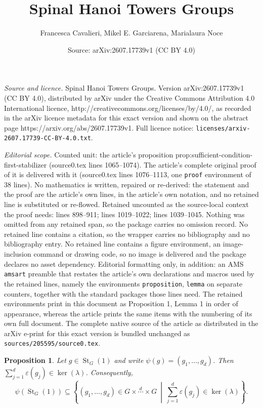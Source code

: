 \documentclass[10pt,a4paper]{amsart}
\title{Spinal Hanoi Towers Groups}
\author{Francesca Cavalieri, Mikel E. Garciarena, Marialaura Noce}
\date{Source: arXiv:2607.17739v1 (CC BY 4.0)}
\newtheorem{proposition}{Proposition}
\DeclareMathOperator{\St}{St}
\begin{document}
\maketitle

\noindent\emph{Source and licence.} Spinal Hanoi Towers Groups. Version arXiv:2607.17739v1 (CC BY 4.0), distributed by arXiv under the Creative Commons Attribution 4.0 International licence, http://creativecommons.org/licenses/by/4.0/, as recorded in the arXiv licence metadata for this exact version and shown on the abstract page https://arxiv.org/abs/2607.17739v1. Full licence notice: \texttt{licenses/arxiv-2607.17739-CC-BY-4.0.txt}.\par\smallskip

\noindent\textit{Editorial scope.} Counted unit: the article's proposition prop:sufficient-condition-first-stabilizer (source0.tex lines 1065--1074). The article's complete original proof of it is delivered with it (source0.tex lines 1076--1113, one \texttt{proof} environment of 38 lines). No mathematics is written, repaired or re-derived: the statement and the proof are the article's own lines, in the article's own notation, and no retained line is substituted or re-flowed.  Retained uncounted as the source-local context the proof needs: lines 898--911; lines 1019--1022; lines 1039--1045.  Nothing was omitted from any retained span, so the package carries no omission record.  No retained line contains a citation, so the wrapper carries no bibliography and no bibliography entry.  No retained line contains a figure environment, an image-inclusion command or drawing code, so no image is delivered and the package declares no asset dependency.  Editorial formatting only, in addition: an AMS \texttt{amsart} preamble that restates the article's own declarations and macros used by the retained lines, namely the environments \texttt{proposition}, \texttt{lemma} on separate counters, together with the standard packages those lines need.  The retained environments print in this document as Proposition 1, Lemma 1 in order of appearance, whereas the article prints the same items with the numbering of its own full document.  The complete native source of the article as distributed in the arXiv e-print for this exact version is bundled unchanged as \texttt{sources/205595/source0.tex}.
\begin{proposition}\label{prop:necessary-condition-first-stabilizer}
Let $g\in \St_G(1)$ and write $\psi(g)=(g_1,\ldots,g_d)$.
Then $\sum_{j=1}^d \varepsilon(g_j)\in \ker(\lambda)$.
Consequently,
\[
\psi(\St_G(1))
\subseteq
\left\{
(g_1,\ldots,g_d)\in G\times \stackrel{d}{\cdots}\times G
\ \middle|\
\sum_{j=1}^d \varepsilon(g_j)\in \ker(\lambda)
\right\}.
\]
\end{proposition}
\end{document}

